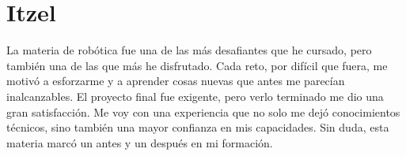 \section{Itzel}
La materia de robótica fue una de las más desafiantes que he cursado, pero también una de las que más he disfrutado. Cada reto, por difícil que fuera, me motivó a esforzarme y a aprender cosas nuevas que antes me parecían inalcanzables. El proyecto final fue exigente, pero verlo terminado me dio una gran satisfacción. Me voy con una experiencia que no solo me dejó conocimientos técnicos, sino también una mayor confianza en mis capacidades. Sin duda, esta materia marcó un antes y un después en mi formación.